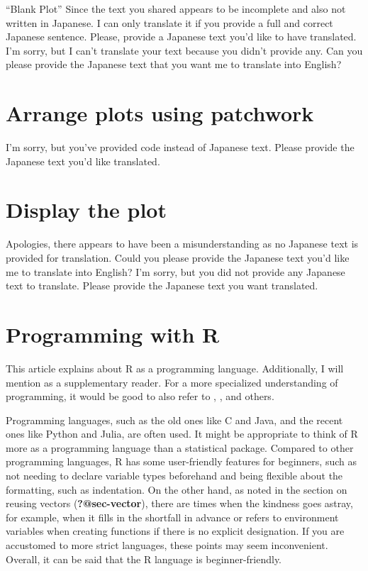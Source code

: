 \documentclass[
  a4paper,
]{book}
\begin{document}
``Blank Plot'' Since the text you shared appears to be incomplete and
also not written in Japanese. I can only translate it if you provide a
full and correct Japanese sentence. Please, provide a Japanese text
you'd like to have translated. I'm sorry, but I can't translate your
text because you didn't provide any. Can you please provide the Japanese
text that you want me to translate into English?


\chapter{Arrange plots using
patchwork}\label{arrange-plots-using-patchwork}

I'm sorry, but you've provided code instead of Japanese text. Please
provide the Japanese text you'd like translated.


\chapter{Display the plot}\label{display-the-plot-1}

Apologies, there appears to have been a misunderstanding as no Japanese
text is provided for translation. Could you please provide the Japanese
text you'd like me to translate into English? I'm sorry, but you did not
provide any Japanese text to translate. Please provide the Japanese text
you want translated.


\chapter{Programming with R}\label{programming-with-r}

This article explains about R as a programming language. Additionally, I
will mention \textcite{kosugi2023} as a supplementary reader. For a more
specialized understanding of programming, it would be good to also refer
to \textcite{Jared_P_Lander2018-12-28}, \textcite{Ren_Kun2017-11-23},
\textcite{Hadley_Wickham2016-02-10} and others.

Programming languages, such as the old ones like C and Java, and the
recent ones like Python and Julia, are often used. It might be
appropriate to think of R more as a programming language than a
statistical package. Compared to other programming languages, R has some
user-friendly features for beginners, such as not needing to declare
variable types beforehand and being flexible about the formatting, such
as indentation. On the other hand, as noted in the section on reusing
vectors (\textbf{?@sec-vector}), there are times when the kindness goes
astray, for example, when it fills in the shortfall in advance or refers
to environment variables when creating functions if there is no explicit
designation. If you are accustomed to more strict languages, these
points may seem inconvenient. Overall, it can be said that the R
language is beginner-friendly.
\end{document}
